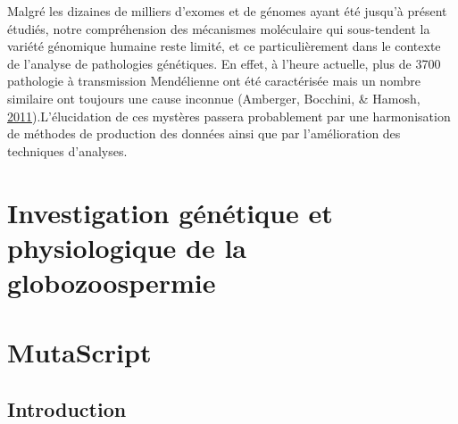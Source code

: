 \documentclass[12pt,twoside]{reedthesis}
\theoremstyle{definition}
\theoremstyle{definition}
\theoremstyle{remark}
\begin{document}
  Malgré les dizaines de milliers d'exomes et de génomes ayant été jusqu'à
  présent étudiés, notre compréhension des mécanismes moléculaire qui
  sous-tendent la variété génomique humaine reste limité, et ce
  particulièrement dans le contexte de l'analyse de pathologies
  génétiques. En effet, à l'heure actuelle, plus de 3700 pathologie à
  transmission Mendélienne ont été caractérisée mais un nombre similaire
  ont toujours une cause inconnue (Amberger, Bocchini, \& Hamosh,
  \protect\hyperlink{ref-Amberger2011}{2011}).L'élucidation de ces
  mystères passera probablement par une harmonisation de méthodes de
  production des données ainsi que par l'amélioration des techniques
  d'analyses.
  
  \hypertarget{globo}{\chapter{Investigation génétique et physiologique de
  la globozoospermie}\label{globo}}
  
  \chapter{MutaScript}\label{mutascript}
  
  \section{Introduction}\label{introduction}
  
\end{document}
